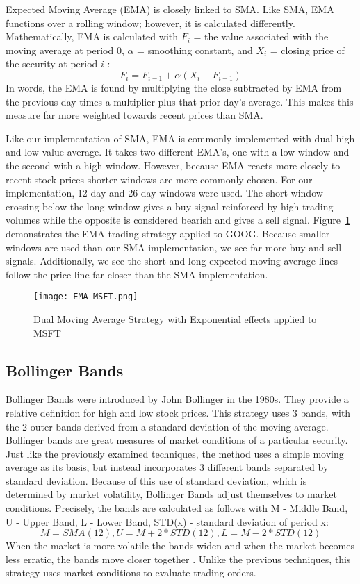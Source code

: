 \documentclass[../thesis.tex]{subfiles}
\begin{document}
Expected Moving Average (EMA) is closely linked to SMA. Like SMA, EMA functions over a rolling window; however, it is calculated differently. Mathematically, EMA is calculated with $F_i$ = the value associated with the moving average at period 0, $\alpha$ = smoothing constant, and $X_i$ = closing price of the security at period $i$ \cite{James1968}:  \[F_i = F_{i-1} +\alpha(X_i - F_{i-1})\]  In words, the EMA is found by multiplying the close subtracted by EMA from the previous day times a multiplier plus that prior day's average. This makes this measure far more weighted towards recent prices than SMA.

Like our implementation of SMA, EMA is commonly implemented with dual high and low value average. It takes two different EMA's, one with a low window and the second with a high window. However, because EMA reacts more closely to recent stock prices shorter windows are more commonly chosen. For our implementation, 12-day and 26-day windows were used. The short window crossing below the long window gives a buy signal reinforced by high trading volumes while the opposite is considered bearish and gives a sell signal. Figure~\ref{EMAfigure} demonstrates the EMA trading strategy applied to GOOG. Because smaller windows are used than our SMA implementation, we see far more buy and sell signals. Additionally, we see the short and long expected moving average lines follow the price line far closer than the SMA implementation.

\begin{figure}[h]
\centering
\texttt{[image: EMA\_MSFT.png]}
\caption{Dual Moving Average Strategy with Exponential effects applied to MSFT \label{overflow}}
\label{EMAfigure}
\end{figure}

\subsection{Bollinger Bands}

Bollinger Bands were introduced by John Bollinger in the 1980s\cite{Liu2006}. They provide a relative definition for high and low stock prices. This strategy uses 3 bands, with the 2 outer bands derived from a standard deviation of the moving average. Bollinger bands are great measures of market conditions of a particular security. Just like the previously examined techniques, the method uses a simple moving average as its basis, but instead incorporates 3 different bands separated by standard deviation. Because of this use of standard deviation, which is determined by market volatility, Bollinger Bands adjust themselves to market conditions. Precisely, the bands are calculated as follows with M - Middle Band, U - Upper Band, L - Lower Band, STD(x) - standard deviation of period x: \[M = SMA(12), U = M + 2 * STD(12),  L = M - 2 * STD(12)\] When the market is more volatile the bands widen and when the market becomes less erratic, the bands move closer together \cite{Liu2006}. Unlike the previous techniques, this strategy uses market conditions to evaluate trading orders.
\end{document}
